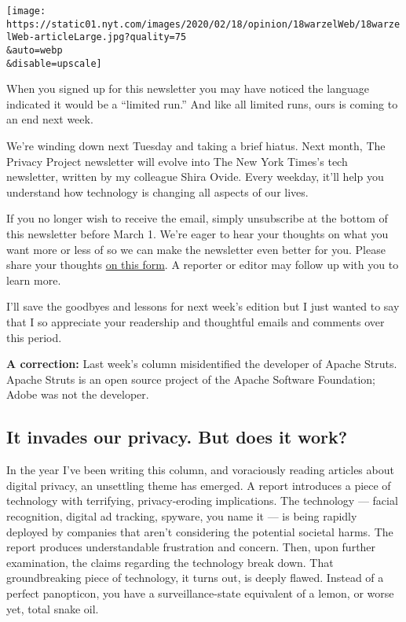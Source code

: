 \texttt{[image: https://static01.nyt.com/images/2020/02/18/opinion/18warzelWeb/18warzelWeb-articleLarge.jpg?quality=75\\\&auto=webp\\\&disable=upscale]}

When you signed up for this newsletter you may have noticed the language
indicated it would be a ``limited run.'' And like all limited runs, ours
is coming to an end next week.

We're winding down next Tuesday and taking a brief hiatus. Next month,
The Privacy Project newsletter will evolve into The New York Times's
tech newsletter, written by my colleague Shira Ovide. Every weekday,
it'll help you understand how technology is changing all aspects of our
lives.

If you no longer wish to receive the email, simply unsubscribe at the
bottom of this newsletter before March 1. We're eager to hear your
thoughts on what you want more or less of so we can make the newsletter
even better for you. Please share your thoughts
\href{https://www.nytimes.com/2020/02/18/reader-center/technology-newsletter-feedback.html}{on
this form}. A reporter or editor may follow up with you to learn more.

I'll save the goodbyes and lessons for next week's edition but I just
wanted to say that I so appreciate your readership and thoughtful emails
and comments over this period.

\textbf{A correction:} Last week's column misidentified the developer of
Apache Struts. Apache Struts is an open source project of the Apache
Software Foundation; Adobe was not the developer.

\hypertarget{it-invades-our-privacy-but-does-it-work}{%
\subsection{It invades our privacy. But does it
work?}\label{it-invades-our-privacy-but-does-it-work}}

In the year I've been writing this column, and voraciously reading
articles about digital privacy, an unsettling theme has emerged. A
report introduces a piece of technology with terrifying, privacy-eroding
implications. The technology --- facial recognition, digital ad
tracking, spyware, you name it --- is being rapidly deployed by
companies that aren't considering the potential societal harms. The
report produces understandable frustration and concern. Then, upon
further examination, the claims regarding the technology break down.
That groundbreaking piece of technology, it turns out, is deeply flawed.
Instead of a perfect panopticon, you have a surveillance-state
equivalent of a lemon, or worse yet, total snake oil.


